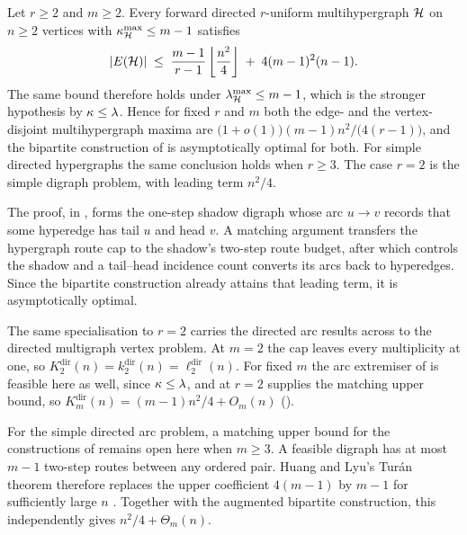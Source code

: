 \begin{theorem}\label{thm:dir-hyper-constant}
Let $r \ge 2$ and $m \ge 2$. Every forward directed $r$-uniform multihypergraph
$\mathcal{H}$ on $n \ge 2$ vertices with $\kappa^{\max}_{\mathcal{H}} \le m-1$ satisfies
\[
    |E(\mathcal{H})| \;\le\; \frac{m-1}{r-1}\left\lfloor \frac{n^2}{4} \right\rfloor \;+\; 4(m-1)^2 (n-1).
\]
The same bound therefore holds under $\lambda^{\max}_{\mathcal{H}} \le m-1$, which is the
stronger hypothesis by $\kappa \le \lambda$. Hence for fixed $r$ and $m$ both the
edge- and the vertex-disjoint multihypergraph maxima are
$\bigl(1+o(1)\bigr)(m-1)n^2/\bigl(4(r-1)\bigr)$, and the bipartite construction
of  is asymptotically optimal for both. For simple directed hypergraphs the same conclusion holds when $r\ge3$. The case $r=2$ is the simple digraph problem, with leading term $n^2/4$.
\end{theorem}

The proof, in , forms the one-step shadow digraph whose arc
$u\to v$ records that some hyperedge has tail $u$ and head $v$. A matching
argument transfers the hypergraph route cap to the shadow's two-step route
budget, after which  controls the shadow and a
tail--head incidence count converts its arcs back to hyperedges. Since the
bipartite construction already attains that leading term, it is asymptotically
optimal.

The same specialisation to $r = 2$ carries the directed arc results across to the
directed multigraph vertex problem. At $m = 2$ the cap leaves every multiplicity
at one, so $K_2^{\mathrm{dir}}(n) = k_2^{\mathrm{dir}}(n) = \ell_2^{\mathrm{dir}}(n)$.
For fixed $m$ the arc extremiser of  is feasible here as
well, since $\kappa \le \lambda$, and  at $r = 2$ supplies the matching
upper bound, so $K_m^{\mathrm{dir}}(n) = (m-1)n^2/4 + O_m(n)$
().

For the simple directed arc problem, a matching upper bound for the constructions of  remains open here when $m\ge3$. A feasible digraph has at most $m-1$ two-step routes between any ordered pair. Huang and Lyu's Tur\'an theorem therefore replaces the upper coefficient $4(m-1)$ by $m-1$ for sufficiently large $n$ \cite{HuangLyu26}. Together with the augmented bipartite construction, this independently gives $n^2/4+\Theta_m(n)$.
